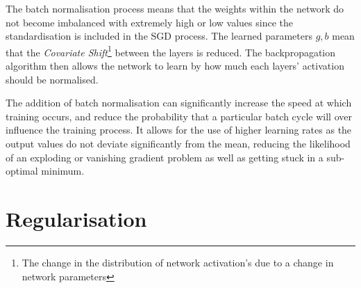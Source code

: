     
            
        The batch normalisation process means that the weights within the network do not become imbalanced with extremely high or low values since the standardisation is included in the SGD process. The learned parameters $g, b$ mean that the \textit{Covariate Shift}\footnote{The change in the distribution of network activation's due to a change in network parameters} between the layers is reduced. The backpropagation algorithm then allows the network to learn by how much each layers' activation should be normalised. 
        
        The addition of batch normalisation can significantly increase the speed at which training occurs, and reduce the probability that a particular batch cycle will over influence the training process. It allows for the use of higher learning rates as the output values do not deviate significantly from the mean, reducing the likelihood of an exploding or vanishing gradient problem as well as getting stuck in a sub-optimal minimum.

\section{Regularisation} \label{sec: regularise}
    
